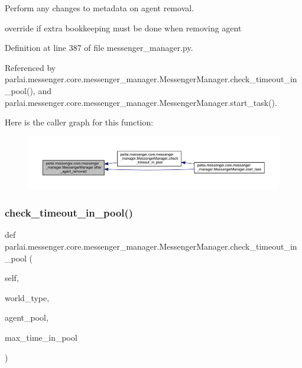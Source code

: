 \begin{DoxyVerb}Perform any changes to metadata on agent removal.

override if extra bookkeeping must be done when removing agent
\end{DoxyVerb}
 

Definition at line 387 of file messenger\+\_\+manager.\+py.



Referenced by parlai.\+messenger.\+core.\+messenger\+\_\+manager.\+Messenger\+Manager.\+check\+\_\+timeout\+\_\+in\+\_\+pool(), and parlai.\+messenger.\+core.\+messenger\+\_\+manager.\+Messenger\+Manager.\+start\+\_\+task().

Here is the caller graph for this function\+:
\nopagebreak
\begin{figure}[H]
\begin{center}
\leavevmode
\includegraphics[width=350pt]{classparlai_1_1messenger_1_1core_1_1messenger__manager_1_1MessengerManager_a238fe5e22bbe928848709edade7ba06c_icgraph}
\end{center}
\end{figure}
\mbox{\label{classparlai_1_1messenger_1_1core_1_1messenger__manager_1_1MessengerManager_ac1f17ccc47844361a32ca3da63ae1c3e}} 
\subsubsection{\texorpdfstring{check\+\_\+timeout\+\_\+in\+\_\+pool()}{check\_timeout\_in\_pool()}}
{\footnotesize\ttfamily def parlai.\+messenger.\+core.\+messenger\+\_\+manager.\+Messenger\+Manager.\+check\+\_\+timeout\+\_\+in\+\_\+pool (\begin{DoxyParamCaption}\item[{}]{self,  }\item[{}]{world\+\_\+type,  }\item[{}]{agent\+\_\+pool,  }\item[{}]{max\+\_\+time\+\_\+in\+\_\+pool }\end{DoxyParamCaption})}

